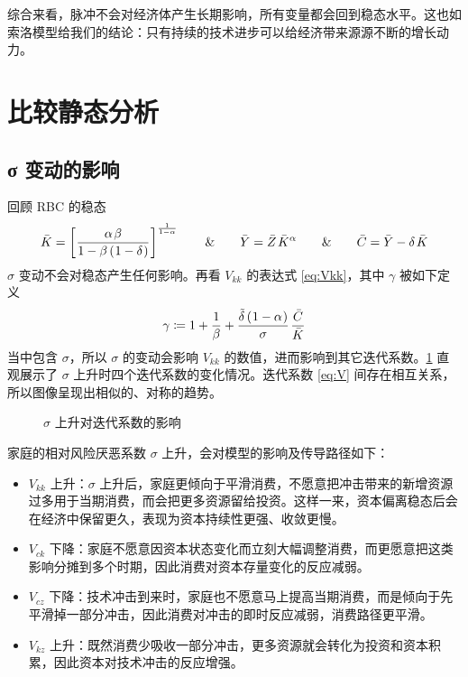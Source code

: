 综合来看，脉冲不会对经济体产生长期影响，所有变量都会回到稳态水平。这也如索洛模型给我们的结论：只有持续的技术进步可以给经济带来源源不断的增长动力。

\section{比较静态分析}\label{sec:Comparative}

\subsection{σ 变动的影响}\label{sec:CompaSigma}

回顾 RBC 的稳态
\begin{equation}
    \bar K=\bks{\dfrac{\alpha\,\beta}{1-\beta\bka{1-\delta}}}^{\frac{1}{1-\alpha}} \qquad \& \qquad \bar Y=\bar Z\,\bar K^\alpha \qquad \& \qquad  \bar C=\bar Y-\delta\,\bar K\label{eq:steady}
\end{equation}
\(\sigma\) 变动不会对稳态产生任何影响。再看 \(V_{kk}\) 的表达式 \ref{eq:Vkk}，其中 \(\gamma\) 被如下定义
\begin{equation*}
    \gamma\coloneq1+\dfrac1\beta+\dfrac{\tilde\delta\bka{1-\alpha}}\sigma\,\dfracb{C}{K}
\end{equation*}
当中包含 \(\sigma\)，所以 \(\sigma\) 的变动会影响 \(V_{kk}\) 的数值，进而影响到其它迭代系数。\ref{fig:compasigma} 直观展示了 \(\sigma\) 上升时四个迭代系数的变化情况。迭代系数 \ref{eq:V} 间存在相互关系，所以图像呈现出相似的、对称的趋势。

\begin{figure}[H]
    \centering
  \caption{\(\sigma\) 上升对迭代系数的影响}
  \label{fig:compasigma}
\end{figure}

家庭的相对风险厌恶系数 \(\sigma\) 上升，会对模型的影响及传导路径如下：
\begin{itemize}
    \item \(V_{kk}\) 上升：\(\sigma\) 上升后，家庭更倾向于平滑消费，不愿意把冲击带来的新增资源过多用于当期消费，而会把更多资源留给投资。这样一来，资本偏离稳态后会在经济中保留更久，表现为资本持续性更强、收敛更慢。
    \item \(V_{ck}\) 下降：家庭不愿意因资本状态变化而立刻大幅调整消费，而更愿意把这类影响分摊到多个时期，因此消费对资本存量变化的反应减弱。
    \item \(V_{cz}\) 下降：技术冲击到来时，家庭也不愿意马上提高当期消费，而是倾向于先平滑掉一部分冲击，因此消费对冲击的即时反应减弱，消费路径更平滑。
    \item \(V_{kz}\) 上升：既然消费少吸收一部分冲击，更多资源就会转化为投资和资本积累，因此资本对技术冲击的反应增强。
\end{itemize}

